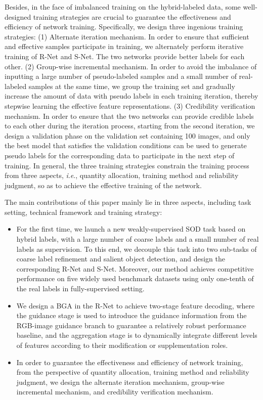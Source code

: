 \documentclass[journal]{IEEEtran}
\newcommand{\ie}{\textit{i}.\textit{e}.}
\begin{document}
Besides, in the face of imbalanced training on the hybrid-labeled data, some well-designed training strategies are crucial to guarantee the effectiveness and efficiency of network training.
Specifically, we design three ingenious training strategies:
(1) Alternate iteration mechanism. In order to ensure that sufficient and effective samples participate in training, we alternately perform iterative training of R-Net and S-Net. The two networks provide better labels for each other.
(2) Group-wise incremental mechanism. In order to avoid the imbalance of inputting a large number of pseudo-labeled samples and a small number of real-labeled samples at the same time, we group the training set and gradually increase the amount of data with pseudo labels in each training iteration, thereby stepwise learning the effective feature representations.
(3) Credibility verification mechanism. In order to ensure that the two networks can provide credible labels to each other during the iteration process, starting from the second iteration, we design a validation phase on the validation set containing 100 images, and only the best model that satisfies the validation conditions can be used to generate pseudo labels for the corresponding data to participate in the next step of training.
In general, the three training strategies constrain the training process from three aspects, \ie, quantity allocation, training method and reliability judgment, so as to achieve the effective training of the network.


The main contributions of this paper mainly lie in three aspects, including task setting, technical framework and training strategy:

\begin{itemize}
\item For the first time, we launch a new weakly-supervised SOD task based on hybrid labels, with a large number of coarse labels and a small number of real labels as supervision. To this end, we decouple this task into two sub-tasks of coarse label refinement and salient object detection, and design the corresponding R-Net and S-Net. Moreover, our method achieves competitive performance on five widely used benchmark datasets using only one-tenth of the real labels in fully-supervised setting.
\item We design a BGA in the R-Net to achieve two-stage feature decoding, where the guidance stage is used to introduce the guidance information from the RGB-image guidance branch to guarantee a relatively robust performance baseline, and the aggregation stage is to dynamically integrate different levels of features according to their modification or supplementation roles.


\item In order to guarantee the effectiveness and efficiency of network training, from the perspective of quantity allocation, training method and reliability judgment, we design the alternate iteration mechanism, group-wise incremental mechanism, and credibility verification mechanism.

\end{itemize}
\end{document}
